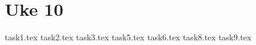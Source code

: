 \section{Uke 10}

{task1.tex}
{task2.tex}
{task3.tex}
{task5.tex}
{task6.tex}
{task8.tex}
{task9.tex}